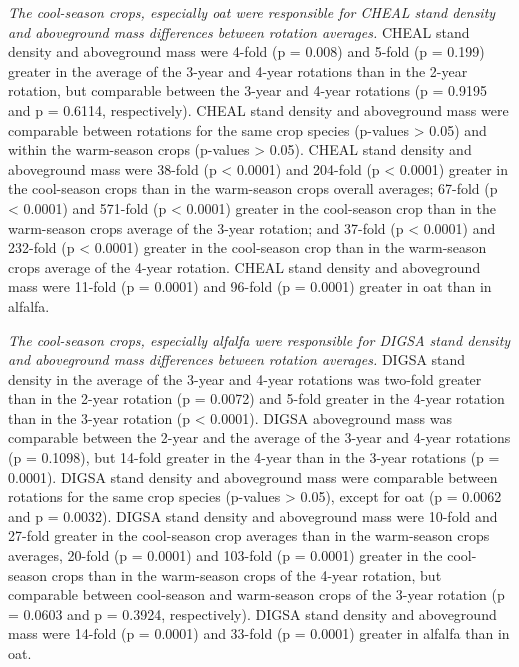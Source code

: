 \documentclass[
]{article}
\begin{document}
\emph{The cool-season crops, especially oat were responsible for CHEAL stand density and aboveground mass differences between rotation averages.} CHEAL stand density and aboveground mass were 4-fold (p = 0.008) and 5-fold (p = 0.199) greater in the average of the 3-year and 4-year rotations than in the 2-year rotation, but comparable between the 3-year and 4-year rotations (p = 0.9195 and p = 0.6114, respectively). CHEAL stand density and aboveground mass were comparable between rotations for the same crop species (p-values \textgreater{} 0.05) and within the warm-season crops (p-values \textgreater{} 0.05). CHEAL stand density and aboveground mass were 38-fold (p \textless{} 0.0001) and 204-fold (p \textless{} 0.0001) greater in the cool-season crops than in the warm-season crops overall averages; 67-fold (p \textless{} 0.0001) and 571-fold (p \textless{} 0.0001) greater in the cool-season crop than in the warm-season crops average of the 3-year rotation; and 37-fold (p \textless{} 0.0001) and 232-fold (p \textless{} 0.0001) greater in the cool-season crop than in the warm-season crops average of the 4-year rotation. CHEAL stand density and aboveground mass were 11-fold (p = 0.0001) and 96-fold (p = 0.0001) greater in oat than in alfalfa.

\emph{The cool-season crops, especially alfalfa were responsible for DIGSA stand density and aboveground mass differences between rotation averages.} DIGSA stand density in the average of the 3-year and 4-year rotations was two-fold greater than in the 2-year rotation (p = 0.0072) and 5-fold greater in the 4-year rotation than in the 3-year rotation (p \textless{} 0.0001). DIGSA aboveground mass was comparable between the 2-year and the average of the 3-year and 4-year rotations (p = 0.1098), but 14-fold greater in the 4-year than in the 3-year rotations (p = 0.0001). DIGSA stand density and aboveground mass were comparable between rotations for the same crop species (p-values \textgreater{} 0.05), except for oat (p = 0.0062 and p = 0.0032). DIGSA stand density and aboveground mass were 10-fold and 27-fold greater in the cool-season crop averages than in the warm-season crops averages, 20-fold (p = 0.0001) and 103-fold (p = 0.0001) greater in the cool-season crops than in the warm-season crops of the 4-year rotation, but comparable between cool-season and warm-season crops of the 3-year rotation (p = 0.0603 and p = 0.3924, respectively). DIGSA stand density and aboveground mass were 14-fold (p = 0.0001) and 33-fold (p = 0.0001) greater in alfalfa than in oat.
\end{document}
